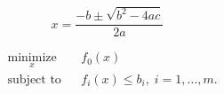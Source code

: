 \[ x = \frac{-b \pm \sqrt{b^2 - 4ac}}{2a} \]

\usepackage{amsmath}
\begin{equation*}
\begin{aligned}
& \underset{x}{\text{minimize}}
& & f_0(x) \\
& \text{subject to}
& & f_i(x) \leq b_i, \; i = 1, \ldots, m.
\end{aligned}
\end{equation*}
